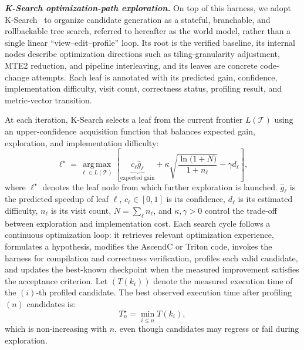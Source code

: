 \textit{\textbf{K-Search optimization-path exploration.}}
On top of this harness, we adopt K-Search~\citep{cao2026k} to organize candidate generation as a stateful, branchable, and rollbackable tree search, referred to hereafter as the world model, rather than a single linear ``view--edit--profile'' loop. Its root is the verified baseline, its internal nodes describe optimization directions such as tiling-granularity adjustment, MTE2 reduction, and pipeline interleaving, and its leaves are concrete code-change attempts. Each leaf is annotated with its predicted gain, confidence, implementation difficulty, visit count, correctness status, profiling result, and metric-vector transition.

At each iteration, K-Search selects a leaf from the current frontier $L(\mathcal{T})$ using an upper-confidence acquisition function that balances expected gain, exploration, and implementation difficulty:
\begin{equation}
\ell^{\star}=\operatorname*{arg\,max}_{\ell\in L(\mathcal{T})}
\left[
\underbrace{c_{\ell}\hat{g}_{\ell}}_{\text{expected gain}}
+\kappa\sqrt{\frac{\ln\!\big(1+N\big)}{1+n_{\ell}}}
-\gamma d_{\ell}
\right],
\label{eq:leaf-selection}
\end{equation}
where $\ell^{\star}$ denotes the leaf node from which further exploration is launched. $\hat{g}_{\ell}$ is the predicted speedup of leaf $\ell$, $c_{\ell}\in[0,1]$ is its confidence, $d_{\ell}$ is its estimated difficulty, $n_{\ell}$ is its visit count, $N=\sum_{\ell}n_{\ell}$, and $\kappa,\gamma>0$ control the trade-off between exploration and implementation cost. Each search cycle follows a continuous optimization loop: it retrieves relevant optimization experience, formulates a hypothesis, modifies the AscendC or Triton code, invokes the harness for compilation and correctness verification, profiles each valid candidate, and updates the best-known checkpoint when the measured improvement satisfies the acceptance criterion. Let $(T(k_i))$ denote the measured execution time of the $(i)$-th profiled candidate. The best observed execution time after profiling $(n)$ candidates is:
\begin{equation}
T_n^{\star}=\min_{i\le n}T(k_i),
\label{eq}
\end{equation}
which is non-increasing with $n$, even though candidates may regress or fail during exploration.

